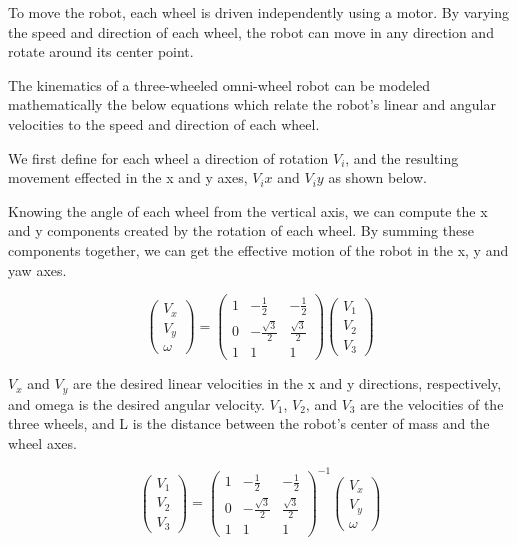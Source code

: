 \documentclass{report}
\begin{document}
    To move the robot, each wheel is driven independently using a motor. By varying the speed and direction of each wheel, the robot can move in any direction and rotate around its center point.
    
    The kinematics of a three-wheeled omni-wheel robot can be modeled mathematically the below equations \cite{riky2021omnidirectional} which relate the robot's linear and angular velocities to the speed and direction of each wheel.
    
    We first define for each wheel a direction of rotation $V_i$, and the resulting movement effected in the x and y axes, $V_ix$ and $V_iy$ as shown below.

    Knowing the angle of each wheel from the vertical axis, we can compute the x and y components created by the rotation of each wheel. By summing these components together, we can get the effective motion of the robot in the x, y and yaw axes.
    
    \[
    \begin{pmatrix}
    V_x \\
    V_y \\
    \omega
    \end{pmatrix}
    =
    \begin{pmatrix}
    1 & - \frac{1}{2} & -\frac{1}{2} \\
    0 & -\frac{\sqrt{3}}{2} & \frac{\sqrt{3}}{2} \\
    1 & 1 & 1
    \end{pmatrix}
    \begin{pmatrix}
    V_1 \\
    V_2 \\
    V_3
    \end{pmatrix}
    \]
        
    $V_{x}$ and $V_{y}$ are the desired linear velocities in the x and y directions, respectively, and omega is the desired angular velocity. $V_{1}$, $V_{2}$, and $V_{3}$ are the velocities of the three wheels, and L is the distance between the robot's center of mass and the wheel axes.

    \[
    \begin{pmatrix}
    V_1 \\
    V_2 \\
    V_3
    \end{pmatrix}
    =
    \begin{pmatrix}
    1 & - \frac{1}{2} & -\frac{1}{2} \\
    0 & -\frac{\sqrt{3}}{2} & \frac{\sqrt{3}}{2} \\
    1 & 1 & 1
    \end{pmatrix}^{-1}
    \begin{pmatrix}
    V_x \\
    V_y \\
    \omega
    \end{pmatrix}
    \]
\end{document}

